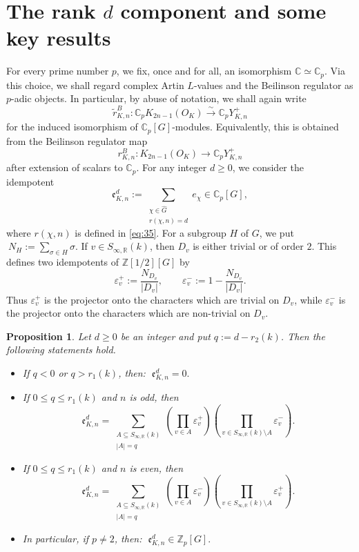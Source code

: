 \documentclass[a4paper,11pt]{article}
\newtheorem{proposition}[theorem]{Proposition}
\begin{document}
\section{The rank $d$ component and some key results}\label{The rank d component}

For every prime number \(p\), we fix, once and for all, an isomorphism
\(\mathbb C\simeq \mathbb C_p\). Via this choice, we shall regard complex
Artin \(L\)-values and the Beilinson regulator as \(p\)-adic objects. In
particular, by abuse of notation, we shall again write
\[
\widetilde r^B_{K,n}:
\mathbb C_p K_{2n-1}(O_K)
\xrightarrow{\sim}
\mathbb C_p Y_{K,n}^{+}
\]
for the induced isomorphism of \(\mathbb C_p[G]\)-modules. Equivalently, this
is obtained from the Beilinson regulator map
\[
r^B_{K,n}:K_{2n-1}(O_K)\longrightarrow \mathbb C_p Y_{K,n}^{+}
\]
after extension of scalars to \(\mathbb C_p\).
For any integer \(d\geq 0\), we consider the idempotent
\[
\mathfrak e^d_{K,n}
:=
\sum_{\substack{\chi\in\widehat G\\ r(\chi,n)=d}}e_\chi
\in
\mathbb C_p[G],
\]
where \(r(\chi,n)\) is defined in \eqref{eq:35}. 
For a subgroup \(H\) of \(G\), we put
\(\
N_H:=\sum_{\sigma\in H}\sigma
\).
If \(v\in S_{\infty,\mathbb R}(k)\), then \(D_v\) is either trivial or of
order \(2\). This defines two idempotents of \(\mathbb Z[1/2][G]\) by
\[
\varepsilon_v^{+}:=\frac{N_{D_v}}{|D_v|},
\qquad
\varepsilon_v^{-}:=1-\frac{N_{D_v}}{|D_v|}.
\]
Thus \(\varepsilon_v^{+}\) is the projector onto the characters which are
trivial on \(D_v\), while \(\varepsilon_v^{-}\) is the projector onto the
characters which are non-trivial on \(D_v\).

\begin{proposition}
Let \(d\geq 0\) be an integer and put
\(
q:=d-r_2(k)
\). Then the following statements hold.
\begin{itemize}
\item If \(q<0\) or \(q>r_1(k)\), then:
\(
\;\mathfrak e^d_{K,n}=0.
\)
\item If \(0\leq q\leq r_1(k)\) and \(n\) is odd, then
\[
\mathfrak e^d_{K,n}
=
\sum_{\substack{A\subseteq S_{\infty,\mathbb R}(k)\\ |A|=q}}
\left(
\prod_{v\in A}\varepsilon_v^{+}
\right)
\left(
\prod_{v\in S_{\infty,\mathbb R}(k)\setminus A}\varepsilon_v^{-}
\right).
\]
\item If \(0\leq q\leq r_1(k)\) and \(n\) is even, then
\[
\mathfrak e^d_{K,n}
=
\sum_{\substack{A\subseteq S_{\infty,\mathbb R}(k)\\ |A|=q}}
\left(
\prod_{v\in A}\varepsilon_v^{-}
\right)
\left(
\prod_{v\in S_{\infty,\mathbb R}(k)\setminus A}\varepsilon_v^{+}
\right).
\]
\item In particular, if \(p\neq 2\), then:
\(
\;\mathfrak e^d_{K,n}\in \mathbb Z_p[G].
\)
\end{itemize}
\end{proposition}
\end{document}
